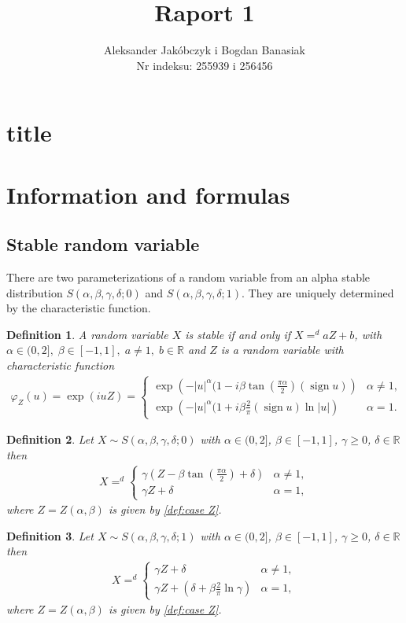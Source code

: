 \documentclass{article}
\title{Raport 1}
\author{Aleksander Jakóbczyk i Bogdan Banasiak\\ 
	Nr indeksu: 255939 i 256456}
\date{}\date{}
\newtheorem{definition}{Definition}
\DeclareMathOperator{\sign}{sign}
\begin{document}
	
	\maketitle
	\section*{title}
	\section{Information and formulas}
		\subsection*{Stable random variable}
		There are two parameterizations of a random variable from an alpha stable distribution $S(\alpha, \beta , \gamma, \delta; 0)$ and $S(\alpha, \beta , \gamma, \delta; 1)$.
		They are uniquely determined by the characteristic function.
		\begin{definition} A random variable $X$ is stable if and only if $X=^d aZ +b$, with \\$\alpha \in (0,2],\;\beta\in [-1,1],\; a\ne1,\; b\in\mathbb{R}$ and $Z$ is a random variable with characteristic function  
			\begin{gather}
				\varphi_Z(u) = \exp(i u Z) =
				\begin{cases}\label{def:case Z}
					\exp\left(- |u|^\alpha(1-i\beta\tan(\frac{\pi\alpha}{2})(\sign u)  \right) &\alpha \ne 1,\\
					\exp\left(- |u|^\alpha(1+i\beta\frac{2}{\pi}(\sign u)\ln|u|  \right) &\alpha = 1.
				\end{cases}
			\end{gather}
		\end{definition}
		\begin{definition} Let $X \sim S(\alpha, \beta , \gamma, \delta; 0)$ with $\alpha \in (0,2]$, $\beta \in [-1,1]$, $\gamma \ge 0$, $\delta\in\mathbb{R}$ then  
			\begin{gather*}
				X =^d 
				\begin{cases}
					\gamma (Z- \beta\tan(\frac{\pi\alpha}{2})+\delta)& \alpha\ne1,\\
					\gamma Z + \delta& \alpha=1,
				\end{cases}
			\end{gather*}
			where $Z = Z(\alpha,\beta)$ is given by \ref{def:case Z}.
		\end{definition}

		\begin{definition} Let $X \sim S(\alpha, \beta , \gamma, \delta; 1)$ with $\alpha \in (0,2]$, $\beta \in [-1,1]$, $\gamma \ge 0$, $\delta\in\mathbb{R}$ then  
			\begin{gather*}
				X =^d 
				\begin{cases}
					\gamma Z + \delta & \alpha \ne 1,\\
					\gamma Z + (\delta + \beta\frac{2}{\pi}\ln\gamma)& \alpha = 1,
				\end{cases}
			\end{gather*}
			where $Z = Z(\alpha,\beta)$ is given by \ref{def:case Z}.
		\end{definition}
\end{document}
